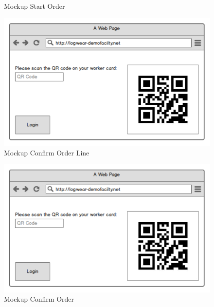\begin{appendices}
\begin{figure}
	\caption{Mockup Start Order}
\end{figure}
\begin{figure}
	\includegraphics[width=\textwidth, page=4]{images/WebAppMockups}
	\caption{Mockup Confirm Order Line}
\end{figure}
\begin{figure}
	\includegraphics[width=\textwidth, page=5]{images/WebAppMockups}
	\caption{Mockup Confirm Order}
\end{figure}
\end{appendices}
